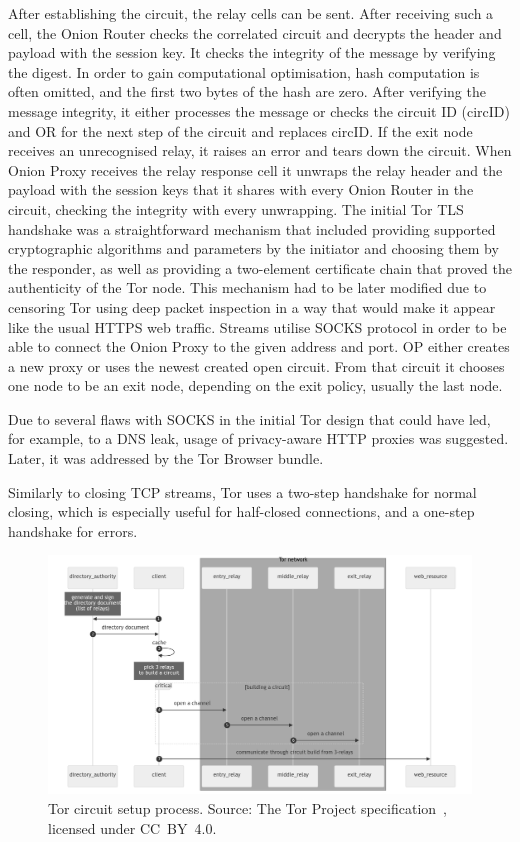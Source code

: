 After establishing the circuit, the relay cells can be sent. After receiving such a cell, the Onion Router checks the correlated circuit and decrypts the header and payload with the session key. It checks the integrity of the message by verifying the digest. In order to gain computational optimisation, hash computation is often omitted, and the first two bytes of the hash are zero. After verifying the message integrity, it either processes the message or checks the circuit ID (circID) and OR for the next step of the circuit and replaces circID. If the exit node receives an unrecognised relay, it raises an error and tears down the circuit. When Onion Proxy receives the relay response cell it unwraps the relay header and the payload with the session keys that it shares with every Onion Router in the circuit, checking the integrity with every unwrapping. 
The initial Tor TLS handshake was a straightforward mechanism that included providing supported cryptographic algorithms and parameters by the initiator and choosing them by the responder, as well as providing a two-element certificate chain that proved the authenticity of the Tor node. This mechanism had to be later modified due to censoring Tor using deep packet inspection in a way that would make it appear like the usual HTTPS web traffic.
Streams utilise SOCKS protocol in order to be able to connect the Onion Proxy to the given address and port. OP either creates a new proxy or uses the newest created open circuit. From that circuit it chooses one node to be an exit node, depending on the exit policy, usually the last node.

Due to several flaws with SOCKS in the initial Tor design that could have led, for example, to a DNS leak, usage of privacy-aware HTTP proxies was suggested. Later, it was addressed by the Tor Browser bundle.

Similarly to closing TCP streams, Tor uses a two-step handshake for normal closing, which is especially useful for half-closed connections, and a one-step handshake for errors.

\begin{figure}[ht]
  \centering
  \includegraphics[width=0.8\linewidth]{Images/tor-circuit.png}
  \caption{Tor circuit setup process. Source: The Tor Project specification~\cite{torproject-specs}, licensed under CC BY 4.0.}
  \label{fig:tor_spec}
\end{figure}

